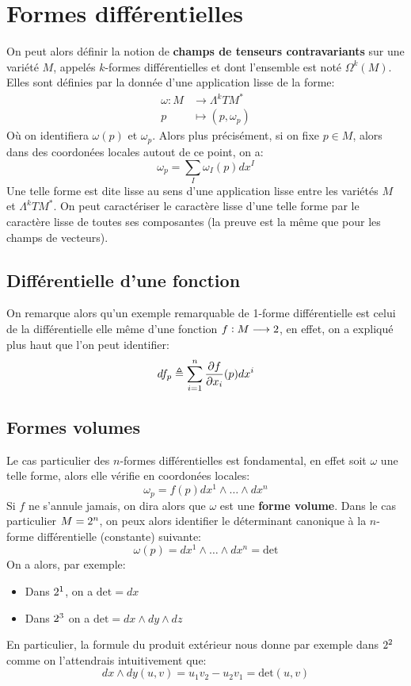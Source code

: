 \chapter{Formes différentielles}
   On peut alors définir la notion de \textbf{champs de tenseurs contravariants} sur une variété \( M \), appelés \( k \)-formes différentielles et dont l'ensemble est noté \( \Omega^k(M) \). Elles sont définies par la donnée d'une application lisse de la forme:
   \[ 
      \begin{aligned}
         \omega : M &\longrightarrow \Lambda^kTM^* \\
         p &\longmapsto (p, \omega_p)
      \end{aligned} 
   \]
   Où on identifiera \( \omega(p) \) et \(\omega_p\). Alors plus précisément, si on fixe \( p \in M \), alors dans des coordonées locales autout de ce point, on a:
   \[ 
      \omega_p = \sum_I \omega_I(p) dx^I
   \]
   Une telle forme est dite lisse au sens d'une application lisse entre les variétés \( M \) et \( \Lambda^kTM^* \). On peut caractériser le caractère lisse d'une telle forme par le caractère lisse de toutes ses composantes (la preuve est la même que pour les champs de vecteurs).

   \section{Différentielle d'une fonction}
   On remarque alors qu'un exemple remarquable de 1-forme différentielle est celui de la différentielle elle même d'une fonction \( f : M \longrightarrow 2 \), en effet, on a expliqué plus haut que l'on peut identifier:
   \[ 
      df_p \triangleq \sum_{i=1}^n \frac{\partial f}{\partial x_i}(p)dx^i
   \]
   \section{Formes volumes}
      Le cas particulier des \(n\)-formes différentielles est fondamental, en effet soit \( \omega \) une telle forme, alors elle vérifie en coordonées locales:
      \[ 
         \omega_p =  f(p)dx^1 \wedge \ldots \wedge dx^n
      \]
      Si \( f \) ne s'annule jamais, on dira alors que \( \omega \) est une \textbf{forme volume}. Dans le cas particulier \( M = 2^n \), on peux alors identifier le déterminant canonique à la \( n \)-forme différentielle (constante) suivante:
      \[ 
         \omega(p) = dx^1 \wedge \ldots \wedge dx^n = \text{det}
      \]
      On a alors, par exemple:
      \begin{itemize}
         \item Dans \(2^1\), on a \(\text{det} = dx\)
         \item Dans \(2^3\) on a \(\text{det} = dx \wedge dy \wedge dz\)
      \end{itemize}
      En particulier, la formule du produit extérieur nous donne par exemple dans \(2^2\) comme on l'attendrais intuitivement que:
      \[ 
         dx \wedge dy(u, v) = u_1v_2 - u_2v_1 = \text{det}(u, v)
      \]
